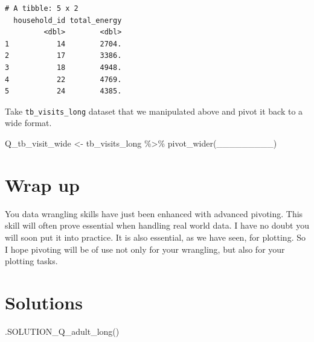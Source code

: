 \documentclass[
  letterpaper,
  DIV=11,
  numbers=noendperiod]{scrreprt}
\newenvironment{Shaded}{\begin{snugshade}}{\end{snugshade}}
\newcommand{\FunctionTok}[1]{\textcolor[rgb]{0.28,0.35,0.67}{#1}}
\newcommand{\NormalTok}[1]{\textcolor[rgb]{0.00,0.23,0.31}{#1}}
\newcommand{\OtherTok}[1]{\textcolor[rgb]{0.00,0.23,0.31}{#1}}
\newcommand{\SpecialCharTok}[1]{\textcolor[rgb]{0.37,0.37,0.37}{#1}}
\begin{document}
\begin{verbatim}
# A tibble: 5 x 2
  household_id total_energy
         <dbl>        <dbl>
1           14        2704.
2           17        3386.
3           18        4948.
4           22        4769.
5           24        4385.
\end{verbatim}

\begin{tcolorbox}[enhanced jigsaw, title=\textcolor{quarto-callout-tip-color}{\faLightbulb}\hspace{0.5em}{Practice}, colbacktitle=quarto-callout-tip-color!10!white, leftrule=.75mm, arc=.35mm, opacityback=0, bottomrule=.15mm, rightrule=.15mm, toptitle=1mm, breakable, toprule=.15mm, colback=white, coltitle=black, colframe=quarto-callout-tip-color-frame, bottomtitle=1mm, titlerule=0mm, left=2mm, opacitybacktitle=0.6]

Take \texttt{tb\_visits\_long} dataset that we manipulated above and
pivot it back to a wide format.

\begin{Shaded}
\begin{Highlighting}[]
\NormalTok{Q\_tb\_visit\_wide }\OtherTok{\textless{}{-}}
\NormalTok{  tb\_visits\_long }\SpecialCharTok{\%\textgreater{}\%}
  \FunctionTok{pivot\_wider}\NormalTok{(\_\_\_\_\_\_\_\_\_)}
\end{Highlighting}
\end{Shaded}

\end{tcolorbox}

\section{Wrap up}\label{wrap-up-9}

You data wrangling skills have just been enhanced with advanced
pivoting. This skill will often prove essential when handling real world
data. I have no doubt you will soon put it into practice. It is also
essential, as we have seen, for plotting. So I hope pivoting will be of
use not only for your wrangling, but also for your plotting tasks.

\section{Solutions}\label{solutions-8}

\begin{Shaded}
\begin{Highlighting}[]
\FunctionTok{.SOLUTION\_Q\_adult\_long}\NormalTok{()}
\end{Highlighting}
\end{Shaded}
\end{document}

